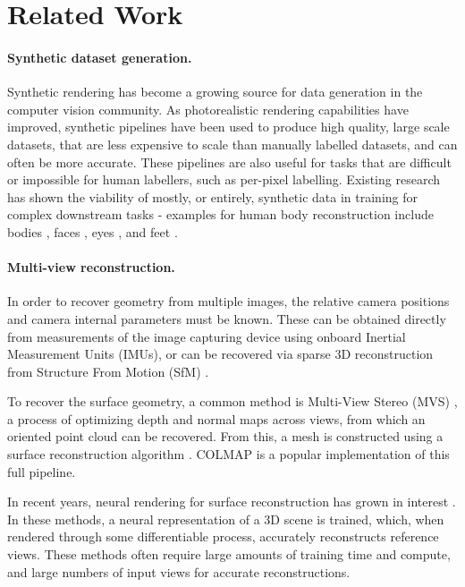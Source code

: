 \section{Related Work}

\paragraph{Synthetic dataset generation.} Synthetic rendering has become a growing source for data generation in the computer vision community. As photorealistic rendering capabilities have improved, synthetic pipelines have been used to produce high quality, large scale datasets, that are less expensive to scale than manually labelled datasets, and can often be more accurate. These pipelines are also useful for tasks that are difficult or impossible for human labellers, such as per-pixel labelling. Existing research has shown the viability of mostly, or entirely, synthetic data in training for complex downstream tasks - examples for human body reconstruction include bodies \cite{varol2017learning}, faces \cite{wood2021fake, bae2023digiface}, eyes \cite{wood2015rendering}, and feet \cite{boyne2024found}.

\paragraph{Multi-view reconstruction.} In order to recover geometry from multiple images, the relative camera positions and camera internal parameters must be known. These can be obtained directly from measurements of the image capturing device using onboard Inertial Measurement Units (IMUs), or can be recovered via sparse 3D reconstruction from Structure From Motion (SfM) \cite{schonberger2016structure}.

To recover the surface geometry, a common method is Multi-View Stereo (MVS) \cite{schonberger2016pixelwise}, a process of optimizing depth and normal maps across views, from which an oriented point cloud can be recovered. From this, a mesh is constructed using a surface reconstruction algorithm \cite{kazhdan2013screened}. COLMAP \cite{schonberger2016structure, schonberger2016pixelwise} is a popular implementation of this full pipeline.

In recent years, neural rendering for surface reconstruction has grown in interest \cite{mildenhall2021nerf, yariv2020multiview}. In these methods, a neural representation of a 3D scene is trained, which, when rendered through some differentiable process, accurately reconstructs reference views. These methods often require large amounts of training time and compute, and large numbers of input views for accurate reconstructions.


